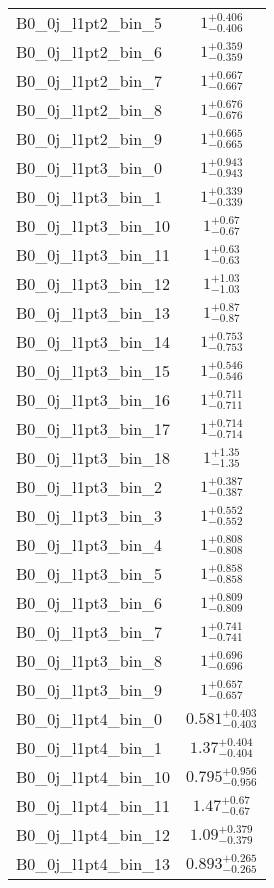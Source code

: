 \begin{tabular}{|l|c|}
B0\_0j\_l1pt2\_bin\_5 & $1^{+0.406}_{-0.406}$ \\
B0\_0j\_l1pt2\_bin\_6 & $1^{+0.359}_{-0.359}$ \\
B0\_0j\_l1pt2\_bin\_7 & $1^{+0.667}_{-0.667}$ \\
B0\_0j\_l1pt2\_bin\_8 & $1^{+0.676}_{-0.676}$ \\
B0\_0j\_l1pt2\_bin\_9 & $1^{+0.665}_{-0.665}$ \\
B0\_0j\_l1pt3\_bin\_0 & $1^{+0.943}_{-0.943}$ \\
B0\_0j\_l1pt3\_bin\_1 & $1^{+0.339}_{-0.339}$ \\
B0\_0j\_l1pt3\_bin\_10 & $1^{+0.67}_{-0.67}$ \\
B0\_0j\_l1pt3\_bin\_11 & $1^{+0.63}_{-0.63}$ \\
B0\_0j\_l1pt3\_bin\_12 & $1^{+1.03}_{-1.03}$ \\
B0\_0j\_l1pt3\_bin\_13 & $1^{+0.87}_{-0.87}$ \\
B0\_0j\_l1pt3\_bin\_14 & $1^{+0.753}_{-0.753}$ \\
B0\_0j\_l1pt3\_bin\_15 & $1^{+0.546}_{-0.546}$ \\
B0\_0j\_l1pt3\_bin\_16 & $1^{+0.711}_{-0.711}$ \\
B0\_0j\_l1pt3\_bin\_17 & $1^{+0.714}_{-0.714}$ \\
B0\_0j\_l1pt3\_bin\_18 & $1^{+1.35}_{-1.35}$ \\
B0\_0j\_l1pt3\_bin\_2 & $1^{+0.387}_{-0.387}$ \\
B0\_0j\_l1pt3\_bin\_3 & $1^{+0.552}_{-0.552}$ \\
B0\_0j\_l1pt3\_bin\_4 & $1^{+0.808}_{-0.808}$ \\
B0\_0j\_l1pt3\_bin\_5 & $1^{+0.858}_{-0.858}$ \\
B0\_0j\_l1pt3\_bin\_6 & $1^{+0.809}_{-0.809}$ \\
B0\_0j\_l1pt3\_bin\_7 & $1^{+0.741}_{-0.741}$ \\
B0\_0j\_l1pt3\_bin\_8 & $1^{+0.696}_{-0.696}$ \\
B0\_0j\_l1pt3\_bin\_9 & $1^{+0.657}_{-0.657}$ \\
B0\_0j\_l1pt4\_bin\_0 & $0.581^{+0.403}_{-0.403}$ \\
B0\_0j\_l1pt4\_bin\_1 & $1.37^{+0.404}_{-0.404}$ \\
B0\_0j\_l1pt4\_bin\_10 & $0.795^{+0.956}_{-0.956}$ \\
B0\_0j\_l1pt4\_bin\_11 & $1.47^{+0.67}_{-0.67}$ \\
B0\_0j\_l1pt4\_bin\_12 & $1.09^{+0.379}_{-0.379}$ \\
B0\_0j\_l1pt4\_bin\_13 & $0.893^{+0.265}_{-0.265}$ \\

\end{tabular}
